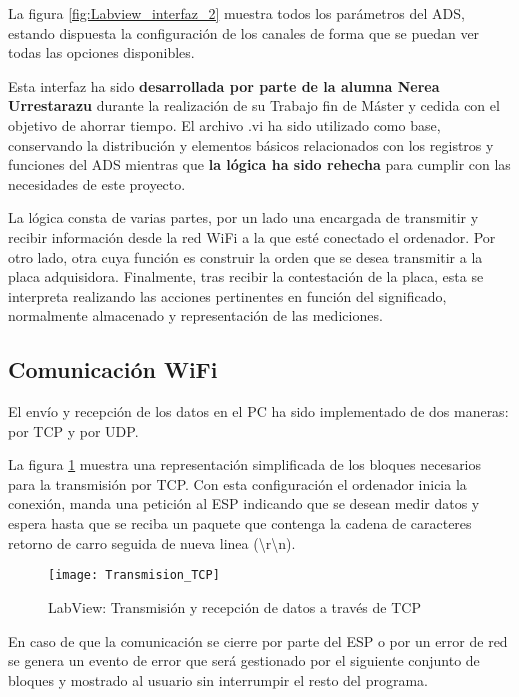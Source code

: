 La figura \ref{fig:Labview_interfaz_2} muestra todos los parámetros del ADS, estando dispuesta la configuración de los canales de forma que se puedan ver todas las opciones disponibles.

Esta interfaz ha sido \textbf{desarrollada por parte de la alumna Nerea Urrestarazu} durante la realización de su Trabajo fin de Máster y cedida con el objetivo de ahorrar tiempo. El archivo .vi ha sido utilizado como base, conservando la distribución y elementos básicos relacionados con los registros y funciones del ADS mientras que \textbf{la lógica ha sido rehecha} para cumplir con las necesidades de este proyecto.

La lógica consta de varias partes, por un lado una encargada de transmitir y recibir información desde la red WiFi a la que esté conectado el ordenador. Por otro lado, otra cuya función es construir la orden que se desea transmitir a la placa adquisidora. Finalmente, tras recibir la contestación de la placa, esta se interpreta realizando las acciones pertinentes en función del significado, normalmente almacenado y representación de las mediciones.

\clearpage

\subsection{Comunicación WiFi\label{sec:Software_Labview_WiFi}}

El envío y recepción de los datos en el PC ha sido implementado de dos maneras: por TCP y por UDP. 

La figura \ref{fig:Labview_Transmision_TCP} muestra una representación simplificada de los bloques necesarios para la transmisión por TCP. Con esta configuración el ordenador inicia la conexión, manda una petición al ESP indicando que se desean medir datos y espera hasta que se reciba un paquete que contenga la cadena de caracteres retorno de carro seguida de nueva linea (\textbackslash r\textbackslash n).

\begin{figure} [h]
    \centering
    \texttt{[image: Transmision\_TCP]}
    \caption{LabView: Transmisión y recepción de datos a través de TCP}
    \label{fig:Labview_Transmision_TCP}
\end{figure}

En caso de que la comunicación se cierre por parte del ESP o por un error de red se genera un evento de error que será gestionado por el siguiente conjunto de bloques y mostrado al usuario sin interrumpir el resto del programa.

